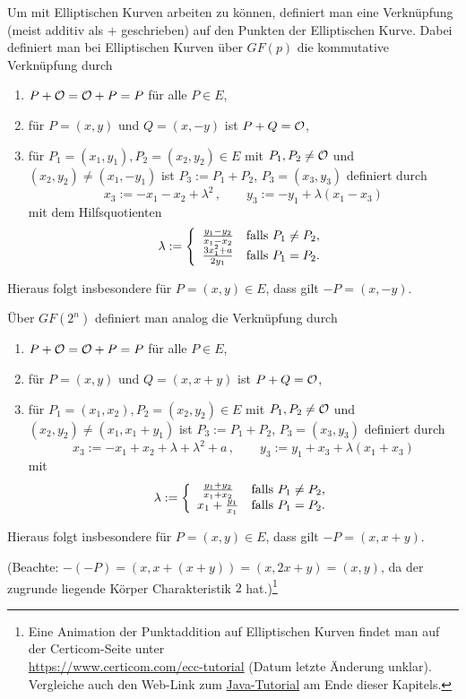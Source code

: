 \begin{refsegment}
Um mit Elliptischen Kurven arbeiten zu können, definiert man eine Verknüpfung (meist additiv als $+$ geschrieben) auf den Punkten der Elliptischen Kurve. Dabei definiert man bei Elliptischen Kurven über $GF(p)$ die kommutative Verknüpfung durch
\begin{enumerate}
\item $P+{\cal O}={\cal O}+P=P$ für alle $P\in E$,
\item für $P=(x,y)$ und $Q=(x,-y)$ ist $P+Q={\cal O}$,
\item für $P_1=(x_1,y_1),P_2=(x_2,y_2)\in E$ mit $P_1,P_2\ne {\cal O}$
und $(x_2,y_2)\ne (x_1,-y_1)$ ist $P_3:=P_1+P_2$, $P_3=(x_3,y_3)$ definiert durch
$$ x_3:=-x_1-x_2+\lambda^2 \, , \qquad y_3:=-y_1+\lambda (x_1-x_3)
$$
mit dem Hilfsquotienten
$$ \lambda:=\left\{ \begin{array}{cl} \frac{y_1-y_2}{x_1-x_2} & {\rm falls~} P_1\ne P_2,\\
                                     \frac{3x_1^2+a}{2y_1} & {\rm falls~} P_1=P_2. \end{array} \right.
$$
\end{enumerate}
Hieraus folgt insbesondere für $P=(x,y)\in E$, dass gilt $-P=(x,-y)$.

Über $GF(2^n)$ definiert man analog die Verknüpfung durch
\begin{enumerate}
\item $P+{\cal O}={\cal O}+P=P$ für alle $P\in E$,
\item für $P=(x,y)$ und $Q=(x,x+y)$ ist $P+Q={\cal O}$,
\item für $P_1=(x_1,x_2),P_2=(x_2,y_2)\in E$ mit $P_1,P_2\ne {\cal O}$ und $(x_2,y_2)\ne (x_1,x_1+y_1)$ ist $P_3:=P_1+P_2$, $P_3=(x_3,y_3)$ definiert durch
$$ x_3:=-x_1+x_2+\lambda+\lambda^2+a \, , \qquad y_3:=y_1+x_3+\lambda (x_1+x_3)
$$
mit
$$ \lambda:=\left\{ \begin{array}{cl} \frac{y_1+y_2}{x_1+x_2} & {\rm falls~} P_1\ne P_2,\\
                                   x_1+\frac{y_1}{x_1} & {\rm falls~} P_1=P_2. \end{array}\right.
$$
\end{enumerate}
Hieraus folgt insbesondere für $P=(x,y)\in E$, dass gilt $-P=(x,x+y)$.

(Beachte: $-(-P)=(x,x+(x+y))=(x,2x+y)=(x,y)$, da der zugrunde liegende Körper Charakteristik $2$ hat.)\footnote{%
Eine Animation der Punktaddition auf Elliptischen Kurven
findet man auf der Certicom-Seite unter\\
\url{https://www.certicom.com/ecc-tutorial} (Datum letzte Änderung unklar).\\
Vergleiche auch den Web-Link zum \hyperlink{ec:Web-Link:Java_Laubrock}
{Java-Tutorial} am Ende dieser Kapitels.

}
\end{refsegment}
